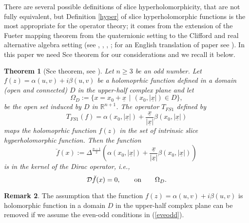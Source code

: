 \documentclass[reqno,11pt]{amsart}
\numberwithin{equation}{section}
\newtheorem{theorem}{Theorem}[section]
\theoremstyle{definition}
\newtheorem{remark}[theorem]{{\bf Remark}}
\begin{document}
\medskip
There are several possible definitions of slice hyperholomorphicity, that are not fully equivalent, but Definition \ref{hyper} of slice hyperholomorphic functions is the most appropriate for the operator theory; it comes from the extension of the Fueter mapping theorem from the quaternionic setting to the Clifford and real alternative algebra setting (see \cite{F}, \cite{GP}, \cite{Q1}, \cite{S}; for an English translation of paper \cite{S} see \cite{CSS3}).
In this paper we need Sce theorem for our considerations and we recall it below.
\begin{theorem}[Sce theorem, see \cite{S}]
	\label{FS}
	Let $n \geq 3$ be an odd number. Let $f(z)= \alpha(u,v)+i \beta(u,v)$ be a holomoprhic function defined in a domain (open and connected) $D$ in the upper-half complex plane and let
	$$ \Omega_D:= \{x=x_0+ \underline{x} \,\  |\  \, (x_0, |\underline{x}|) \in D\},$$
	be the open set induced by $D$ in $ \mathbb{R}^{n+1}$. The operator $T_{FS1}$ defined by
	\begin{equation}
		\label{slice}
		T_{FS1}(f)= \alpha(x_0, | \underline{x}|)+ \frac{\underline{x}}{| \underline{x}|} \beta(x_0, |\underline{x}|)
	\end{equation}
	maps the holomoprhic function $f(z)$ in the set of intrinsic slice hyperholomorphic function. Then the function
	$$ \breve{f}(x):= \Delta^{\frac{n-1}{2}} \left(\alpha(x_0, | \underline{x}|)+ \frac{\underline{x}}{| \underline{x}|} \beta(x_0, |\underline{x}|)\right)$$
	is in the kernel of the Dirac operator, i.e.,
	$$ \mathcal D \breve{f}(x)=0, \qquad \hbox{on} \qquad \Omega_D.$$
\end{theorem}

\begin{remark}\label{remevenodd}
	The assumption that the function $f(z)= \alpha(u,v)+i \beta(u,v)$ is holomorphic function
	in a domain  $D$ in the upper-half complex plane
	can be removed if we assume the even-odd conditions in (\ref{eveodd}).
\end{remark}
\end{document}
